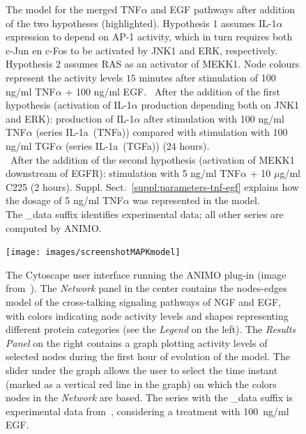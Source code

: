 \documentclass{bmcart}
\begin{document}
\begin{backmatter}
\begin{figure}[!tpb]
\begin{center}
\end{center}
\caption{\scriptsize
{\bf \protect{}} The model for the merged TNF$\alpha$ and EGF pathways
after addition of the two hypotheses (highlighted).
Hypothesis 1 assumes IL-1$\alpha$ expression to depend on AP-1 activity, which in turn requires
both c-Jun en c-Fos to be activated by JNK1 and ERK, respectively. Hypothesis 2 assumes RAS as an activator
of MEKK1. Node colours represent the activity levels $15$ minutes
after stimulation of 100 ng/ml TNF$\alpha$ + 100 ng/ml EGF.
{\bf \protect{}}~After the addition of the first hypothesis (activation of IL-1$\alpha$ production depending both
on JNK1 and ERK): production of IL-1$\alpha$ after stimulation with 100 ng/ml TNF$\alpha$ (series {\sf IL-1a~(TNFa)})
compared with stimulation with 100 ng/ml TGF$\alpha$ (series {\sf IL-1a~(TGFa)}) (24 hours).\\
{\bf \protect{}}~After the addition of the second hypothesis (activation of MEKK1 downstream of EGFR):
stimulation with 5 ng/ml TNF$\alpha$ + 10 $\mu$g/ml C225 (2 hours).
Suppl. Sect.~\ref{suppl:parameters-tnf-egf} explains how the dosage of 5 ng/ml TNF$\alpha$ was represented in the model.\\
The {\sf \_{}data} suffix identifies experimental data; all other series are computed by ANIMO.}\label{fig:large-model-graph}
\end{figure}



\begin{figure}[htbp]
\begin{center}
   \texttt{[image: images/screenshotMAPKmodel]}
\end{center}
\caption{The Cytoscape user interface running the ANIMO plug-in
(image from~\cite{animo-bibe}). The \emph{Network} panel in the center contains the nodes-edges
model of the cross-talking signaling pathways of NGF and EGF, with
colors indicating node activity levels and shapes representing different protein categories (see the \emph{Legend} on the left).
The \emph{Results Panel} on the right contains a graph plotting activity levels of selected nodes
during the first hour of evolution of the model. The slider under the graph
allows the user to select the time instant (marked as a vertical red line in the graph) on which
the colors nodes in the \emph{Network} are based.
The series with the {\sf \_data} suffix is experimental
data from~\cite{egf-ngf}, considering a treatment with 100~ng/ml EGF.
\label{fig:cytoscape}}
\end{figure}



\end{backmatter}
\end{document}
